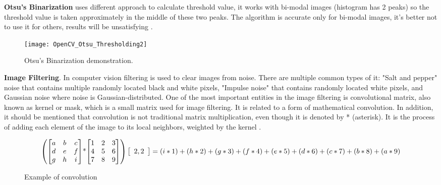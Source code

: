 \documentclass[../../../../main]{subfiles}
\begin{document}
\textbf{Otsu's Binarization} uses different approach to calculate threshold value, it works with bi-modal images (histogram has 2 peaks) so the threshold value is taken approximately in the middle of these two peaks. The algorithm is accurate only for bi-modal images, it's better not to use it for others, results will be unsatisfying \cite{opencv_docs_thresholding}.

\begin{figure} [!ht]
\begin{center}
\texttt{[image: OpenCV\_Otsu\_Thresholding2]}
\caption{Otsu's Binarization demonstration.}
\label{fig:otsuThresholding}
\end{center}
\end{figure}

\textbf{Image Filtering}. In computer vision filtering is used to clear images from noise. There are multiple common types of it: "Salt and pepper" noise that contains multiple randomly located black and white pixels, "Impulse noise" that contains randomly located white pixels, and Gaussian noise where noise is Gaussian-distributed.
One of the most important entities in the image filtering is convolutional matrix, also known as kernel or mask, which is a small matrix used for image filtering. It is related to a form of mathematical convolution. In addition, it should be mentioned that convolution is not traditional matrix multiplication, even though it is denoted by * (asterisk). It is the process of adding each element of the image to its local neighbors, weighted by the kernel \cite{opencv_docs_image_smoothing}. 

\begin{figure} [!ht]
  \centering    
    \begin{equation}
        \begin{pmatrix} 
           \begin{bmatrix} 
               a & b & c \\ 
               d & e & f \\
               g & h & i
           \end{bmatrix}
           $*$
           \begin{bmatrix} 
               1 & 2 & 3 \\ 
               4 & 5 & 6 \\
               7 & 8 & 9
           \end{bmatrix}
        \end{pmatrix}
        \left[ \begin{array}{cc} 2, 2 \end{array} \right] = (i*1) + (h*2) + (g*3) + (f*4) + \\ (e*5)+ (d*6) + (c*7) + (b*8) + (a*9)
    \end{equation}
  \caption{Example of convolution}
\end{figure}
\end{document}
